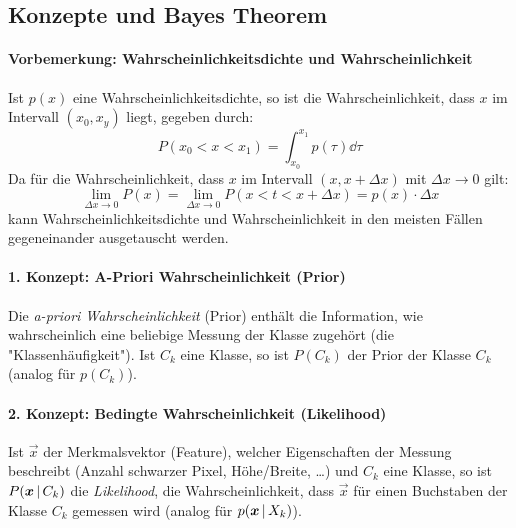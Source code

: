 		\subsection{Konzepte und Bayes Theorem}
			\paragraph{Vorbemerkung: Wahrscheinlichkeitsdichte und Wahrscheinlichkeit}
				Ist \( p(x) \) eine Wahrscheinlichkeitsdichte, so ist die Wahrscheinlichkeit, dass \(x\) im Intervall \( (x_0, x_y) \) liegt, gegeben durch:
				\begin{equation*}
					P(x_0 < x < x_1) = \int_{x_0}^{x_1} \! p(\tau) \dd{\tau}
				\end{equation*}
				Da für die Wahrscheinlichkeit, dass \( x \) im Intervall \( (x, x + \Delta x) \) mit \( \Delta x \to 0 \) gilt:
				\begin{equation*}
					\lim\limits_{\Delta x \to 0} P(x) = \lim\limits_{\Delta x \to 0} P(x < t < x + \Delta x) = p(x) \cdot \Delta x
				\end{equation*}
				kann Wahrscheinlichkeitsdichte und Wahrscheinlichkeit in den meisten Fällen gegeneinander ausgetauscht werden.
		
			\paragraph{1. Konzept: A-Priori Wahrscheinlichkeit (Prior)}
				Die \emph{a-priori Wahrscheinlichkeit} (Prior) enthält die Information, wie wahrscheinlich eine beliebige Messung der Klasse zugehört (\dh die "Klassenhäufigkeit"). Ist \( C_k \) eine Klasse, so ist \( P(C_k) \) der Prior \bzgl der Klasse \( C_k \) (analog für \( p(C_k) \)).
			
			\paragraph{2. Konzept: Bedingte Wahrscheinlichkeit (Likelihood)}
				Ist \(\vec{x}\) der Merkmalsvektor (Feature), welcher Eigenschaften der Messung beschreibt (Anzahl schwarzer Pixel, Höhe/Breite, \dots) und \( C_k \) eine Klasse, so ist \( P(\bm{x} \,\vert\, C_k) \) die \emph{Likelihood}, \dh die Wahrscheinlichkeit, dass \(\vec{x}\) für einen Buchstaben der Klasse \( C_k \) gemessen wird (analog für \( p(\bm{x} \,\vert\, X_k) \)).
			
